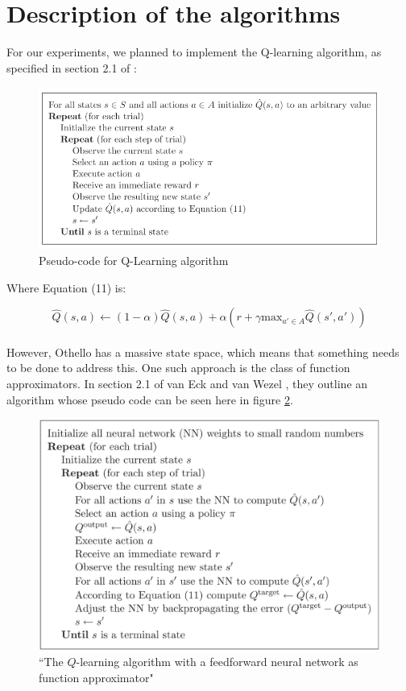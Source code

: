 \documentclass{article}
\begin{document}
\section{Description of the algorithms}
For our experiments, we planned to implement the Q-learning algorithm, as specified in section 2.1 of \cite{vanEck2008}:

\begin{figure}[ht]
    \centering
    \includegraphics[width=0.9\linewidth]{figures/Q_algo.png}
    \caption{\label{fig:Q_algo}Pseudo-code for Q-Learning algorithm}
\end{figure}

\noindent Where Equation (11) is:

\begin{equation}
    \hat{Q}(s, a) \leftarrow (1-\alpha)\hat{Q}(s,a) + \alpha\left(r+\gamma \text{max}_{a'\in A}\hat{Q}(s', a')\right)
\end{equation}
\\
However, Othello has a massive state space, which means that something needs to be done to address this. One such approach is the class of function approximators. In section 2.1 of van Eck and van Wezel \cite{vanEck2008}, they outline an algorithm whose pseudo code can be seen here in figure \ref{fig:deep_Q_algo}.

\begin{figure}[ht]
    \centering
    \includegraphics[width=0.9\linewidth]{figures/Deep_Q_Algo.png}
    \caption{\label{fig:deep_Q_algo}``The $Q$-learning algorithm with a feedforward neural network as function approximator" \cite{vanEck2008}}
\end{figure}
\end{document}
